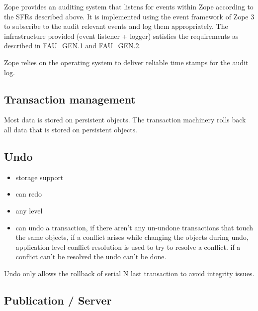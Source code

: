 \documentclass[12pt,english]{scrbook}
\begin{document}
Zope provides an auditing system that listens for events within Zope according
to the SFRs described above. It is implemented using the event framework of
Zope 3 to subscribe to the audit relevant events and log them appropriately.
The infrastructure provided (event listener + logger) satisfies the
requirements as described in FAU{\_}GEN.1 and FAU{\_}GEN.2.

Zope relies on the operating system to deliver reliable time stamps for the
audit log.





\subsection{Transaction management}

Most data is stored on persistent objects. The transaction machinery rolls back
all data that is stored on persistent objects.





\subsection{Undo}
\begin{itemize}
\item {} 
storage support

\item {} 
can redo

\item {} 
any level

\item {} 
can undo a transaction, if there aren't any un-undone transactions that touch
the same objects, if a conflict arises while changing the objects during
undo, application level conflict resolution is used to try to resolve a
conflict. if a conflict can't be resolved the undo can't be done.

\end{itemize}

Undo only allows the rollback of serial N last transaction to avoid integrity issues.





\subsection{Publication / Server}
\end{document}
